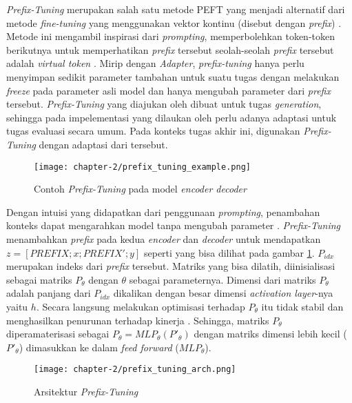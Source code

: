 \textit{Prefix-Tuning} merupakan salah satu metode PEFT yang menjadi alternatif dari metode \textit{fine-tuning} yang menggunakan vektor kontinu (disebut dengan \textit{prefix}) \parencite{prefix_tuning}. Metode ini mengambil inspirasi dari \textit{prompting}, memperbolehkan token-token berikutnya untuk memperhatikan \textit{prefix} tersebut seolah-seolah \textit{prefix} tersebut adalah \textit{virtual token} \parencite{prefix_tuning}. Mirip dengan \textit{Adapter}, \textit{prefix-tuning} hanya perlu menyimpan sedikit parameter tambahan untuk suatu tugas dengan melakukan \textit{freeze} pada parameter asli model dan hanya mengubah parameter dari \textit{prefix} tersebut. \textit{Prefix-Tuning} yang diajukan oleh \citeauthor{prefix_tuning} dibuat untuk tugas \textit{generation}, sehingga pada impelementasi yang dilaukan oleh \citeauthor{adapters} perlu adanya adaptasi untuk tugas evaluasi secara umum. Pada konteks tugas akhir ini, digunakan \textit{Prefix-Tuning} dengan adaptasi dari \citeauthor{adapters} tersebut. 

\begin{figure}[h]
    \vspace{0.25cm}
    \centering
    \texttt{[image: chapter-2/prefix\_tuning\_example.png]}
    \caption{Contoh \textit{Prefix-Tuning} pada model \textit{encoder decoder} \parencite{prefix_tuning}}
    \label{fig:prefix_tuning_example}
\end{figure}

Dengan intuisi yang didapatkan dari penggunaan \textit{prompting}, penambahan konteks dapat mengarahkan model tanpa mengubah parameter \parencite{prefix_tuning}. \textit{Prefix-Tuning} menambahkan \textit{prefix} pada kedua \textit{encoder} dan \textit{decoder} untuk mendapatkan $z = [PREFIX;x;PREFIX';y]$ seperti yang bisa dilihat pada gambar \ref{fig:prefix_tuning_example}. $P_{idx}$ merupakan indeks dari \textit{prefix} tersebut. Matriks yang bisa dilatih, diinisialisasi sebagai matriks $P_\theta$ dengan $\theta$ sebagai parameternya. Dimensi dari matriks $P_\theta$ adalah panjang dari $P_{idx}$ dikalikan dengan besar dimensi \textit{activation layer}-nya yaitu $h$. Secara langsung melakukan optimisasi terhadap $P_\theta$ itu tidak stabil dan menghasilkan penurunan terhadap kinerja \parencite{prefix_tuning}. Sehingga, matriks $P_\theta$ diperamaterisasi sebagai $P_\theta = MLP_\theta(P'_\theta)$ dengan matriks dimensi lebih kecil ($P'_\theta$) dimasukkan ke dalam \textit{feed forward} ($MLP_\theta$).

\begin{figure}[h]
    \vspace{0.25cm}
    \centering
    \texttt{[image: chapter-2/prefix\_tuning\_arch.png]}
    \caption{Arsitektur \textit{Prefix-Tuning} \parencite{adapterhub}}
    \label{fig:prefix_tuning_arch}
\end{figure}

